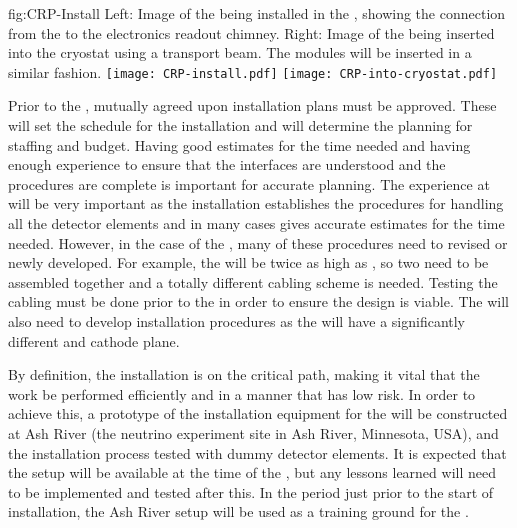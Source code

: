 \begin{dunefigure}{fig:CRP-Install}
  {Left: Image of the   being installed in
  the , showing the connection from the  to the
  electronics readout chimney. Right: Image of the  being
  inserted into the cryostat using a transport beam.  The \dual {} modules will be inserted in a similar fashion.}
\texttt{[image: CRP-install.pdf]}
\texttt{[image: CRP-into-cryostat.pdf]}
\end{dunefigure}

Prior to the , mutually agreed upon installation plans must
be approved. These will set the schedule for the installation and will
determine the planning for staffing and budget. Having good estimates
for the time needed and having enough experience to ensure that the
interfaces are understood and the procedures are complete is important
for accurate planning. The experience at  will be
very important as the  installation establishes the
procedures for handling all the detector elements and in many cases
gives accurate estimates for the time needed. However, in the case of
the , many of these procedures need to revised or
newly developed. For example, the  will be twice as high as
, so two  need to be assembled together
and a totally different cabling scheme is needed. Testing the
cabling must be done prior to the  %
in order to
ensure the design is viable. The  will also need to develop
installation procedures as the  
will have a significantly different  and cathode plane. 

By definition, the installation  is on the critical path, making it vital
that the work be performed efficiently and in a manner that has low
risk. In order to achieve this, a prototype of the installation
equipment for the   will be constructed at Ash
River (the \nova neutrino experiment  site in Ash River, Minnesota, USA), and the installation process tested with dummy detector
elements. It is expected that the setup will be available at the time
of the , but any lessons learned will need to be implemented and
tested after this. In the period just prior to the start of
installation, the Ash River setup will be used as a training ground for
the .

